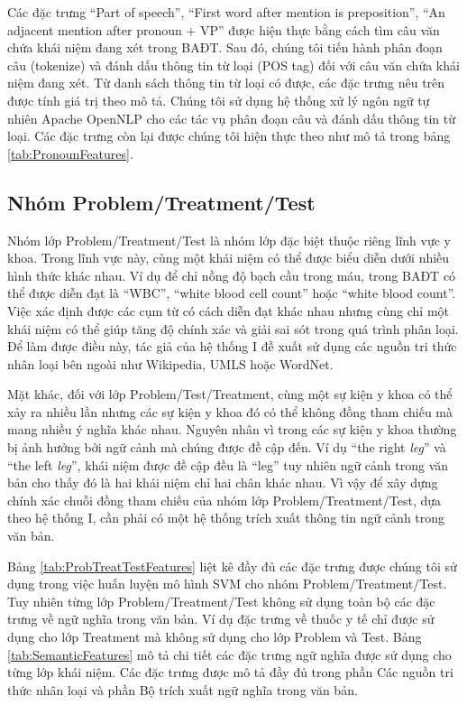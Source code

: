Các đặc trưng ``Part of speech'', ``First word after mention is preposition'', ``An adjacent mention after pronoun + VP'' được hiện thực bằng cách tìm câu văn chứa khái niệm đang xét trong BAĐT. Sau đó, chúng tôi tiến hành phân đoạn câu (tokenize) và đánh dấu thông tin từ loại (POS tag) đối với câu văn chứa khái niệm đang xét. Từ danh sách thông tin từ loại có được, các đặc trưng nêu trên được tính giá trị theo mô tả. Chúng tôi sử dụng hệ thống xử lý ngôn ngữ tự nhiên Apache OpenNLP cho các tác vụ phân đoạn câu và đánh dấu thông tin từ loại. Các đặc trưng còn lại được chúng tôi hiện thực theo như mô tả trong bảng \ref{tab:PronounFeatures}.

\subsection*{Nhóm Problem/Treatment/Test}
Nhóm lớp Problem/Treatment/Test là nhóm lớp đặc biệt thuộc riêng lĩnh vực y khoa. Trong lĩnh vực này, cùng một khái niệm có thể được biểu diễn dưới nhiều hình thức khác nhau. Ví dụ để chỉ nồng độ bạch cầu trong máu, trong BAĐT có thể được diễn đạt là ``WBC'', ``white blood cell count'' hoặc ``white blood count''. Việc xác định được các cụm từ có cách diễn đạt khác nhau nhưng cùng chỉ một khái niệm có thể giúp tăng độ chính xác và giải sai sót trong quá trình phân loại. Để làm được điều này, tác giả của hệ thống I đề xuất sử dụng các nguồn tri thức nhân loại bên ngoài như Wikipedia, UMLS hoặc WordNet.

Mặt khác, đối với lớp Problem/Test/Treatment, cùng một sự kiện y khoa có thể xảy ra nhiều lần nhưng các sự kiện y khoa đó có thể không đồng tham chiếu mà mang nhiều ý nghĩa khác nhau. Nguyên nhân vì trong các sự kiện y khoa thường bị ảnh hưởng bởi ngữ cảnh mà chúng được đề cập đến. Ví dụ ``the right \textit{leg}'' và ``the left \textit{leg}'', khái niệm được đề cập đều là ``leg'' tuy nhiên ngữ cảnh trong văn bản cho thấy đó là hai khái niệm chỉ hai chân khác nhau. Vì vậy để xây dựng chính xác chuỗi đồng tham chiếu của nhóm lớp Problem/Treatment/Test, dựa theo hệ thống I, cần phải có một hệ thống trích xuất thông tin ngữ cảnh trong văn bản.

Bảng \ref{tab:ProbTreatTestFeatures} liệt kê đầy đủ các đặc trưng được chúng tôi sử dụng trong việc huấn luyện mô hình SVM cho nhóm Problem/Treatment/Test. Tuy nhiên từng lớp Problem/Treatment/Test không sử dụng toàn bộ các đặc trưng về ngữ nghĩa trong văn bản. Ví dụ đặc trưng về thuốc y tế chỉ được sử dụng cho lớp Treatment mà không sử dụng cho lớp Problem và Test. Bảng \ref{tab:SemanticFeatures} mô tả chi tiết các đặc trưng ngữ nghĩa được sử dụng cho từng lớp khái niệm. Các đặc trưng được mô tả đầy đủ trong phần Các nguồn tri thức nhân loại và phần Bộ trích xuất ngữ nghĩa trong văn bản.

